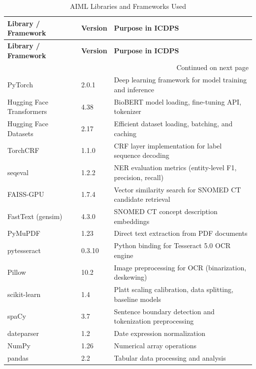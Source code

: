 \begin{longtable}{|p{4.9cm}|p{1.5cm}|p{7.8cm}|}
\caption{AIML Libraries and Frameworks Used}
\label{tab:aiml_libraries}\\

\hline
\textbf{Library / Framework} &
\textbf{Version} &
\textbf{Purpose in ICDPS} \\
\hline
\endfirsthead

\hline
\textbf{Library / Framework} &
\textbf{Version} &
\textbf{Purpose in ICDPS} \\
\hline
\endhead

\hline
\multicolumn{3}{r}{Continued on next page} \\
\endfoot

\hline
\endlastfoot


PyTorch &
2.0.1 &
Deep learning framework for model training and inference \\
\hline

Hugging Face Transformers &
4.38 &
BioBERT model loading, fine-tuning API, tokenizer \\
\hline

Hugging Face Datasets &
2.17 &
Efficient dataset loading, batching, and caching \\
\hline

TorchCRF &
1.1.0 &
CRF layer implementation for label sequence decoding \\
\hline

seqeval &
1.2.2 &
NER evaluation metrics (entity-level F1, precision, recall) \\
\hline

FAISS-GPU &
1.7.4 &
Vector similarity search for SNOMED CT candidate retrieval \\
\hline

FastText (gensim) &
4.3.0 &
SNOMED CT concept description embeddings \\
\hline

PyMuPDF &
1.23 &
Direct text extraction from PDF documents \\
\hline

pytesseract &
0.3.10 &
Python binding for Tesseract 5.0 OCR engine \\
\hline

Pillow &
10.2 &
Image preprocessing for OCR (binarization, deskewing) \\
\hline

scikit-learn &
1.4 &
Platt scaling calibration, data splitting, baseline models \\
\hline

spaCy &
3.7 &
Sentence boundary detection and tokenization preprocessing \\
\hline

dateparser &
1.2 &
Date expression normalization \\
\hline

NumPy &
1.26 &
Numerical array operations \\
\hline

pandas &
2.2 &
Tabular data processing and analysis \\
\hline

\end{longtable}

